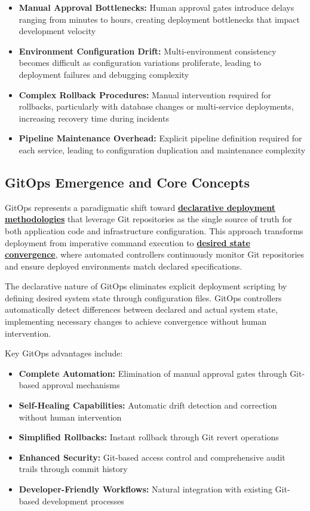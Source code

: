 \begin{itemize}
\item \textbf{Manual Approval Bottlenecks:} Human approval gates introduce delays ranging from minutes to hours, creating deployment bottlenecks that impact development velocity
\item \textbf{Environment Configuration Drift:} Multi-environment consistency becomes difficult as configuration variations proliferate, leading to deployment failures and debugging complexity
\item \textbf{Complex Rollback Procedures:} Manual intervention required for rollbacks, particularly with database changes or multi-service deployments, increasing recovery time during incidents
\item \textbf{Pipeline Maintenance Overhead:} Explicit pipeline definition required for each service, leading to configuration duplication and maintenance complexity
\end{itemize}

\subsection{GitOps Emergence and Core Concepts}

GitOps represents a paradigmatic shift toward \textbf{\hyperref[weaveworks2017gitops]{declarative deployment methodologies}} that leverage Git repositories as the single source of truth for both application code and infrastructure configuration. This approach transforms deployment from imperative command execution to \textbf{\hyperref[beetz2021gitops]{desired state convergence}}, where automated controllers continuously monitor Git repositories and ensure deployed environments match declared specifications.

The declarative nature of GitOps eliminates explicit deployment scripting by defining desired system state through configuration files. GitOps controllers automatically detect differences between declared and actual system state, implementing necessary changes to achieve convergence without human intervention.

Key GitOps advantages include:

\begin{itemize}
\item \textbf{Complete Automation:} Elimination of manual approval gates through Git-based approval mechanisms
\item \textbf{Self-Healing Capabilities:} Automatic drift detection and correction without human intervention
\item \textbf{Simplified Rollbacks:} Instant rollback through Git revert operations
\item \textbf{Enhanced Security:} Git-based access control and comprehensive audit trails through commit history
\item \textbf{Developer-Friendly Workflows:} Natural integration with existing Git-based development processes
\end{itemize}

